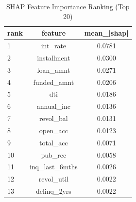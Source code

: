 \begin{table}
\centering
\caption{SHAP Feature Importance Ranking (Top 20)}
\label{tab:shap_ranking}
\begin{tabular}{lcc}
\toprule
rank & feature & mean_|shap| \\
\midrule
1 & int_rate & 0.0781 \\
2 & installment & 0.0300 \\
3 & loan_amnt & 0.0271 \\
4 & funded_amnt & 0.0206 \\
5 & dti & 0.0186 \\
6 & annual_inc & 0.0136 \\
7 & revol_bal & 0.0131 \\
8 & open_acc & 0.0123 \\
9 & total_acc & 0.0071 \\
10 & pub_rec & 0.0058 \\
11 & inq_last_6mths & 0.0026 \\
12 & revol_util & 0.0022 \\
13 & delinq_2yrs & 0.0022 \\
\bottomrule
\end{tabular}
\end{table}
